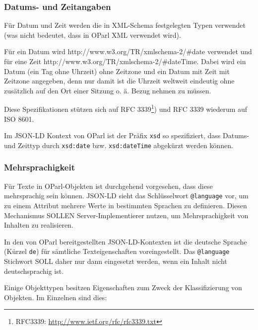 \documentclass[,a4paper]{article}
\begin{document}
\subsubsection{Datums- und Zeitangaben}\label{datums--und-zeitangaben}

Für Datum und Zeit werden die in XML-Schema festgelegten Typen verwendet
(was nicht bedeutet, dass in OParl XML verwendet wird).

Für ein Datum wird http://www.w3.org/TR/xmlschema-2/\#date verwendet und
für eine Zeit http://www.w3.org/TR/xmlschema-2/\#dateTime. Dabei wird
ein Datum (ein Tag ohne Uhrzeit) ohne Zeitzone und ein Datum mit Zeit
mit Zeitzone angegeben, denn nur damit ist die Uhrzeit weltweit
eindeutig ohne zusätzlich auf den Ort einer Sitzung o. ä. Bezug nehmen
zu müssen.

Diese Spezifikationen stützen sich auf RFC 3339\footnote{RFC3339:
  \url{http://www.ietf.org/rfc/rfc3339.txt}}) und RFC 3339 wiederum auf
ISO 8601.

Im JSON-LD Kontext von OParl ist der Präfix \texttt{xsd} so
spezifiziert, dass Datums- und Zeittyp durch \texttt{xsd:date} bzw.
\texttt{xsd:dateTime} abgekürzt werden können.

\subsubsection{Mehrsprachigkeit}\label{mehrsprachigkeit}

Für Texte in OParl-Objekten ist durchgehend vorgesehen, dass diese
mehrsprachig sein können. JSON-LD sieht das Schlüsselwort
\texttt{@language} vor, um zu einem Attribut mehrere Werte in bestimmten
Sprachen zu definieren. Diesen Mechanismus SOLLEN Server-Implementierer
nutzen, um Mehrsprachigkeit von Inhalten zu realisieren.

In den von OParl bereitgestellten JSON-LD-Kontexten ist die deutsche
Sprache (Kürzel \texttt{de}) für sämtliche Texteigenschaften
voreingestellt. Das \texttt{@language} Stichwort SOLL daher nur dann
eingesetzt werden, wenn ein Inhalt nicht deutschsprachig ist.


Einige Objekttypen besitzen Eigenschaften zum Zweck der Klassifizierung
von Objekten. Im Einzelnen sind dies:
\end{document}
